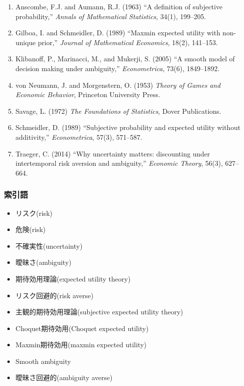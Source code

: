 \documentclass[11pt,a4paper]{article}
\begin{document}
\begin{enumerate}
  \item Anscombe, F.J. and Aumann, R.J. (1963) ``A definition of subjective probability,''
    \textit{Annals of Mathematical Statistics}, 34(1), 199--205.
  \item Gilboa, I. and Schmeidler, D. (1989) ``Maxmin expected utility with non-unique prior,''
    \textit{Journal of Mathematical Economics}, 18(2), 141--153.
  \item Klibanoff, P., Marinacci, M., and Mukerji, S. (2005) ``A smooth model of decision making under ambiguity,''
    \textit{Econometrica}, 73(6), 1849--1892.
  \item von Neumann, J. and Morgenstern, O. (1953) \emph{Theory of Games and Economic Behavior}, Princeton University Press.
  \item Savage, L. (1972) \textit{The Foundations of Statistics}, Dover Publications.
  \item Schmeidler, D. (1989) ``Subjective probability and expected utility without additivity,''
    \textit{Econometrica}, 57(3), 571--587.
  \item Traeger, C. (2014) ``Why uncertainty matters: discounting under intertemporal risk aversion and ambiguity,''
    \textit{Economic Theory}, 56(3), 627--664.
\end{enumerate}

\subsubsection*{索引語}

\begin{itemize}
  \item リスク(risk)
  \item 危険(risk)
  \item 不確実性(uncertainty)
  \item 曖昧さ(ambiguity)
  \item 期待効用理論(expected utility theory)
  \item リスク回避的(risk averse)
  \item 主観的期待効用理論(subjective expected utility theory)
  \item Choquet期待効用(Choquet expected utility)
  \item Maxmin期待効用(maxmin expected utility)
  \item Smooth ambiguity
  \item 曖昧さ回避的(ambiguity averse)
\end{itemize}
\end{document}
